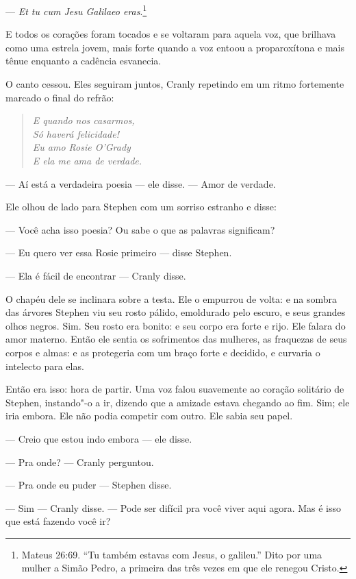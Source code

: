 --- \textit{Et tu cum Jesu Galilaeo eras}.\footnote{ Mateus 26:69.  
“Tu também estavas com Jesus, o galileu.” Dito por uma mulher a Simão Pedro, a
primeira das três vezes em que ele renegou Cristo.}

E todos os corações foram tocados e se voltaram para aquela voz, que
brilhava como uma estrela jovem, mais forte quando a voz entoou a
proparoxítona e mais tênue enquanto a cadência esvanecia.

O canto cessou. Eles seguiram juntos, Cranly repetindo em um ritmo
fortemente marcado o final do refrão:

\begin{verse}\itshape
E quando nos casarmos,\\
Só haverá felicidade!\\
Eu amo Rosie O’Grady\\
E ela me ama de verdade.
\end{verse}

 --- Aí está a verdadeira poesia --- ele disse. --- Amor de verdade.

Ele olhou de lado para Stephen com um sorriso estranho e disse:

 --- Você acha isso poesia? Ou sabe o que as palavras significam?

 --- Eu quero ver essa Rosie primeiro --- disse Stephen.

 --- Ela é fácil de encontrar --- Cranly disse.

O chapéu dele se inclinara sobre a testa. Ele o empurrou de volta: e na
sombra das árvores Stephen viu seu rosto pálido, emoldurado pelo
escuro, e seus grandes olhos negros. Sim. Seu rosto era bonito: e seu
corpo era forte e rijo. Ele falara do amor materno. Então ele sentia os
sofrimentos das mulheres, as fraquezas de seus corpos e almas: e as
protegeria com um braço forte e decidido, e curvaria o intelecto para
elas.

Então era isso: hora de partir. Uma voz falou suavemente ao coração
solitário de Stephen, instando"-o a ir, dizendo que a amizade estava
chegando ao fim. Sim; ele iria embora. Ele não podia competir com
outro. Ele sabia seu papel.

 --- Creio que estou indo embora --- ele disse.

 --- Pra onde? --- Cranly perguntou.

 --- Pra onde eu puder --- Stephen disse.

 --- Sim --- Cranly disse. --- Pode ser difícil pra você viver aqui agora. Mas é
isso que está fazendo você ir?

